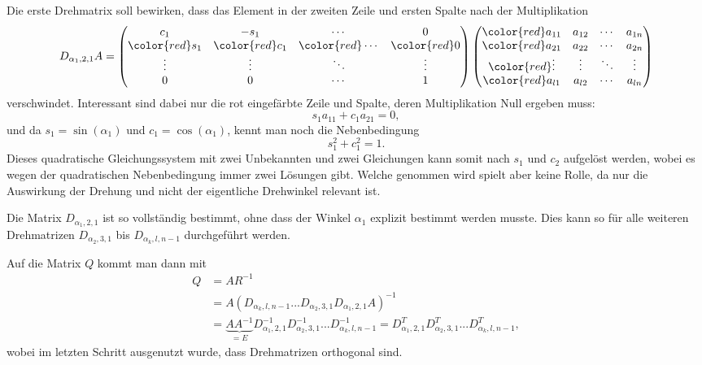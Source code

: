 Die erste Drehmatrix soll bewirken, dass das Element in der zweiten Zeile und ersten Spalte nach der Multiplikation 
\begin{equation*}
	D_{\alpha_1, 2,1}A=
	\begin{pmatrix}
		c_1   &-s_1  &\cdots &0\\
		\color{red}s_1   & \color{red}c_1  &\color{red}\cdots &\color{red}0\\
		\vdots&\vdots&\ddots&\vdots\\
		0     &0     &\cdots&1\\
	\end{pmatrix}
	\begin{pmatrix}
		\color{red}a_{11}&a_{12}&\cdots&a_{1n}\\
		\color{red}a_{21}&a_{22}&\cdots&a_{2n}\\
		\color{red}\vdots&\vdots&\ddots&\vdots\\
		\color{red}a_{l1}&a_{l2}&\cdots&a_{ln}
	\end{pmatrix}
\end{equation*}
verschwindet.
Interessant sind dabei nur die rot eingefärbte Zeile und Spalte, deren Multiplikation Null ergeben muss:
\begin{equation*}
	s_1 a_{11}+c_1 a_{21}=0,
\end{equation*}
und da $s_1=\sin(\alpha_1)$ und $c_1=\cos(\alpha_1)$, kennt man noch die Nebenbedingung
\begin{equation*}
	s_1^2+c_1^2=1.
\end{equation*} 
Dieses quadratische Gleichungssystem mit zwei Unbekannten und zwei Gleichungen kann somit nach $s_1$ und $c_2$ aufgelöst werden, wobei es wegen der quadratischen Nebenbedingung immer zwei Lösungen gibt.
Welche genommen wird spielt aber keine Rolle, da nur die Auswirkung der Drehung und nicht der eigentliche Drehwinkel relevant ist.

Die Matrix $D_{\alpha_1, 2,1}$ ist so vollständig bestimmt, ohne dass der Winkel $\alpha_1$ explizit bestimmt werden musste.
Dies kann so für alle weiteren Drehmatrizen $D_{\alpha_2, 3,1}$ bis $D_{\alpha_k, l,n-1}$ durchgeführt werden.

Auf die Matrix $Q$ kommt man dann mit
\begin{align*}
Q&=AR^{-1}\\&=A(D_{\alpha_k,l,n-1}...D_{\alpha_2,3,1}D_{\alpha_1,2,1}A)^{-1}\\&=
\underbrace{AA^{-1}}_{\displaystyle=E}D_{\alpha_1,2,1}^{-1}D_{\alpha_2,3,1}^{-1}... D_{\alpha_k, l,n-1}^{-1}=
D_{\alpha_1,2,1}^{T}D_{\alpha_2,3,1}^{T}...D_{\alpha_k, l,n-1}^{T},
\end{align*}
wobei im letzten Schritt ausgenutzt wurde, dass Drehmatrizen orthogonal sind.

